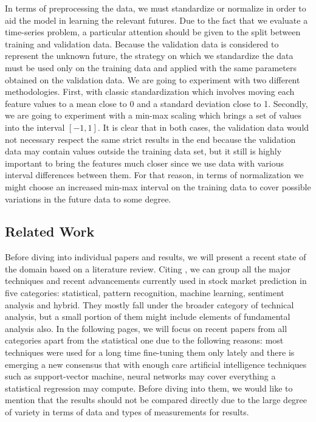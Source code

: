 In terms of preprocessing the data, we must standardize or normalize in order to aid the model in learning the relevant futures. Due to the fact that we evaluate a time-series problem, a particular attention should be given to the split between training and validation data. Because the validation data is considered to represent the unknown future, the strategy on which we standardize the data must be used only on the training data and applied with the same parameters obtained on the validation data. We are going to experiment with two different methodologies. First, with classic standardization which involves moving each feature values to a mean close to 0 and a standard deviation close to 1. Secondly, we are going to experiment with a min-max scaling which brings a set of values into the interval $[-1, 1]$. It is clear that in both cases, the validation data would not necessary respect the same strict results in the end because the validation data may contain values outside the training data set, but it still is highly important to bring the features much closer since we use data with various interval differences between them. For that reason, in terms of normalization we might choose an increased min-max interval on the training data to cover possible variations in the future data to some degree.

\subsection{Related Work}

Before diving into individual papers and results, we will present a recent state of the domain based on a literature review. Citing \cite{shah2019stock}, we can group all the major techniques and recent advancements currently used in stock market prediction in five categories: statistical, pattern recognition, machine learning, sentiment analysis and hybrid. They mostly fall under the broader category of technical analysis, but a small portion of them might include elements of fundamental analysis also. In the following pages, we will focus on recent papers from all categories apart from the statistical one due to the following reasons: most techniques were used for a long time fine-tuning them only lately and there is emerging a new consensus that with enough care artificial intelligence techniques such as support-vector machine, neural networks may cover everything a statistical regression may compute. Before diving into them, we would like to mention that the results should not be compared directly due to the large degree of variety in terms of data and types of measurements for results.

